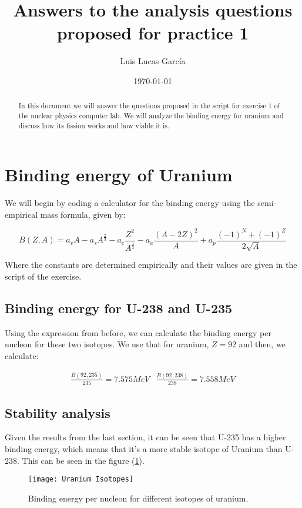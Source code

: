 \documentclass{article} %
\author{Luis Lucas García}
\title{Answers to the analysis questions proposed for practice 1}
\date{\today}
\affil{Facultad de ciencias - Universidad de Alicante - Física nuclear y de partículas - Grupo L3 - Grado en física}
\begin{document}
\maketitle
\begin{abstract}
In this document we will answer the questions proposed in the script for exercise 1 of the nuclear physics computer lab. We will analyze the binding energy for uranium and discuss how its fission works and how viable it is.
\end{abstract}
\tableofcontents

\section{Binding energy of Uranium}

We will begin by coding a calculator for the binding energy using the semi-empirical mass formula, given by:

\begin{equation}
B(Z, A) = a_v A -a_s A^{\frac{2}{3}} - a_c \frac{Z^2}{A^{\frac{1}{3}}} - a_a \frac{(A-2Z)^2}{A} + a_p \frac{(-1)^N + (-1)^Z}{2 \sqrt{A}}
\end{equation}

Where the constants are determined empirically and their values are given in the script of the exercise.

\subsection{Binding energy for U-238 and U-235}

Using the expression from before, we can calculate the binding energy per nucleon for these two isotopes. We use that for uranium, $Z = 92$ and then, we calculate:

$$
\begin{array}{cc}
\frac{B(92, 235)}{235} = 7.575 MeV & \frac{B(92, 238)}{238} = 7.558 MeV
\end{array}
$$

\subsection{Stability analysis}

Given the results from the last section, it can be seen that U-235 has a higher binding energy, which means that it's a more stable isotope of Uranium than U-238. This can be seen in the figure (\ref{fig:UIsot}).

\begin{figure}[h!]
\begin{center}
\texttt{[image: Uranium Isotopes]}
\caption{Binding energy per nucleon for different isotopes of uranium.}
\label{fig:UIsot}
\end{center}
\end{figure}
\end{document}
